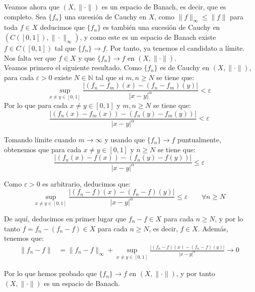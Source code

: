\documentclass[12pt]{article}
\begin{document}
\begin{ejercicio}
        Veamos ahora que $(X,\|\cdot \|)$ es un espacio de Banach, es decir, que es completo. Sea $\{f_n\}$ una sucesión de Cauchy en $X$, como $\|f\|_\infty \leq \|f\|$ para toda $f\in X$ deducimos que $\{f_n\}$ es también una sucesión de Cauchy en $(C([0,1]),\|\cdot \|_\infty)$, y como este es un espacio de Banach existe $f\in C([0,1])$ tal que $\{f_n\}\to f$. Por tanto, ya tenemos el candidato a límite. Nos falta ver que $f\in X$ y que $\{f_n\}\to f$ en $(X,\|\cdot \|)$.\\

        Veamos primero el siguiente resultado. Como $\{f_n\}$ es de Cauchy en $(X,\|\cdot \|)$, para cada $\varepsilon>0$ existe $N\in \mathbb{N}$ tal que si $m,n\geq N$ se tiene que:
        \begin{equation*}
            \sup_{x\neq y \in [0,1]}\frac{|(f_n-f_m)(x)-(f_n-f_m)(y)|}{|x-y|^{\alpha}} < \varepsilon
        \end{equation*}
        Por lo que para cada $x\neq y \in [0,1]$ y $m,n\geq N$ se tiene que:
        \begin{equation*}
            \frac{|(f_n(x)-f_m(x))-(f_n(y)-f_m(y))|}{|x-y|^{\alpha}} < \varepsilon
        \end{equation*}

        Tomando límite cuando $m\to \infty$ y usando que $\{f_n\}\to f$ puntualmente, obtenemos que para cada $x\neq y \in [0,1]$ y $n\geq N$ se tiene que:
        \begin{equation*}
            \frac{|(f_n(x)-f(x))-(f_n(y)-f(y))|}{|x-y|^{\alpha}} \leq \varepsilon
        \end{equation*}

        Como $\varepsilon>0$ es arbitrario, deducimos que:
        \begin{equation*}
            \sup_{x\neq y \in [0,1]}\frac{|(f_n-f)(x)-(f_n-f)(y)|}{|x-y|^{\alpha}} \leq \varepsilon \qquad \forall n\geq N
        \end{equation*}

        De aquí, deducimos en primer lugar que $f_n-f\in X$ para cada $n\geq N$, y por lo tanto $f=f_n-(f_n-f)\in X$ para cada $n\geq N$, es decir, $f\in X$. Además, tenemos que:
        \begin{align*}
            \|f_n-f\| &= \|f_n-f\|_\infty + \sup_{x\neq y \in [0,1]}\frac{|(f_n-f)(x)-(f_n-f)(y)|}{|x-y|^{\alpha}} \to 0
        \end{align*}

        Por lo que hemos probado que $\{f_n\}\to f$ en $(X,\|\cdot \|)$, y por tanto $(X,\|\cdot \|)$ es un espacio de Banach.
    \end{ejercicio}
\end{document}
